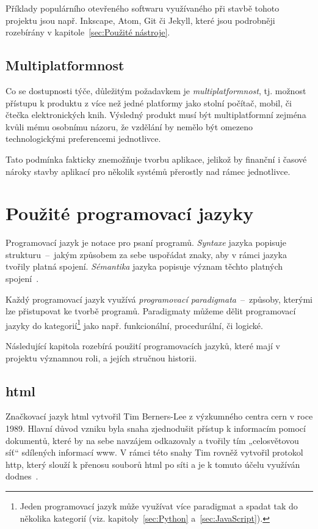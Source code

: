 \documentclass[a4paper, 12pt]{article}
\newcommand*{\fullref}[1]{\hyperref[{#1}]{\ref*{#1}}}
\begin{document}
  Příklady populárního otevřeného softwaru využívaného při stavbě tohoto projektu jsou např. Inkscape, Atom, Git či Jekyll, které jsou podrobněji rozebírány v kapitole~\fullref{sec:Použité nástroje}.


  \subsection{Multiplatformnost}
  Co se dostupnosti týče, důležitým požadavkem je \emph{multiplatformnost}, tj. možnost přístupu k produktu z více než jedné platformy jako stolní počítač, mobil, či čtečka elektronických knih. Výsledný produkt musí být multiplatformní zejména kvůli mému osobnímu názoru, že vzdělání by nemělo být omezeno technologickými preferencemi jednotlivce.

  Tato podmínka fakticky znemožňuje tvorbu aplikace, jelikož by finanční i časové nároky stavby aplikací pro několik systémů přerostly nad rámec jednotlivce.


  \section{Použité programovací jazyky}
  Programovací jazyk je notace pro psaní programů. \emph{Syntaxe} jazyka popisuje strukturu~--~jakým způsobem za sebe uspořádat znaky, aby v rámci jazyka tvořily platná spojení. \emph{Sémantika} jazyka popisuje význam těchto platných spojení~\cite{intro-to-programming-languages}. %

  Každý programovací jazyk využívá \emph{programovací paradigmata}~--~způsoby, kterými lze přistupovat ke tvorbě programů. Paradigmaty můžeme dělit programovací jazyky do kategorií\footnote{Jeden programovací jazyk může využívat více paradigmat a spadat tak do několika kategorií (viz. kapitoly~\fullref{sec:Python} a~\fullref{sec:JavaScript}).} jako např. funkcionální, procedurální, či logické.

  Následující kapitola rozebírá použití programovacích jazyků, které mají v projektu významnou roli, a jejích stručnou historii.


  \subsection{\acrshort{html}} \label{sec:HTML}
  Značkovací jazyk \gls{html} vytvořil Tim Berners-Lee z výzkumného centra \gls{cern} v roce 1989. Hlavní důvod vzniku byla snaha zjednodušit přístup k informacím pomocí dokumentů, které by na sebe navzájem odkazovaly a tvořily tím „celosvětovou síť“ sdílených informací \gls{www}. V rámci této snahy Tim rovněž vytvořil protokol \gls{http}, který slouží k přenosu souborů \gls{html} po síti a je k tomuto účelu využíván dodnes~\cite{html-history}.
\end{document}
